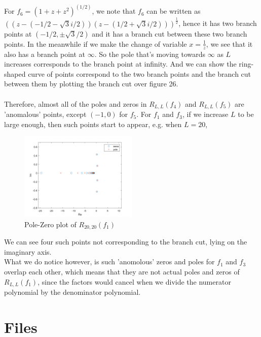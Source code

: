 \documentclass[10pt]{article}
\begin{document}
\noindent For \textbf{$f_6=(1+z+z^2)^{(1/2)}$}, we note that $f_6$ can be written as $((z-(-1/2-\sqrt{3}i/2))(z-(1/2+\sqrt{3}i/2)))^{\frac{1}{2}}$, hence it has two branch points at $(-1/2,\pm\sqrt{3}/2)$ and it has a branch cut between these two branch points. In the meanwhile if we make the change of variable $x=\frac{1}{z}$, we see that it also has a branch point at $\infty$. So the pole that's moving towards $\infty$ as $L$ increases corresponds to the branch point at infinity. And we can show the ring-shaped curve of points correspond to the two branch points and the branch cut between them by plotting the branch cut over figure 26.\\\\

\newpage
\noindent Therefore, almost all of the poles and zeros in $R_{L,L}(f_4)$ and $R_{L,L}(f_5)$ are 'anomalous' points, except $(-1,0)$ for $f_5$. For $f_1$ and $f_3$, if we increase $L$ to be large enough, then such points start to appear, e.g. when $L=20$,
\begin{figure}[H]
\centering
\includegraphics[width=0.5\textwidth]{Files/q5,f1,20.png}
\caption{Pole-Zero plot of $R_{20,20}(f_1)$}
\end{figure}
\noindent We can see four such points not corresponding to the branch cut, lying on the imaginary axis.\\
What we do notice however, is such 'anomolous' zeros and poles for $f_1$ and $f_3$ overlap each other, which means that they are not actual poles and zeros of $R_{L,L}(f_1)$, since the factors would cancel when we divide the numerator polynomial by the denominator polynomial.\\



\newpage
\section*{Files}
\end{document}
